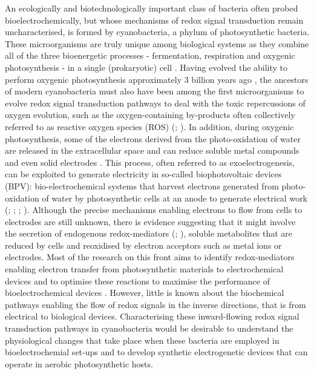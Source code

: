 An ecologically and biotechnologically important class of bacteria often probed bioelectrochemically, but whose mechanisms of redox signal transduction remain uncharacterised, is formed by cyanobacteria, a phylum of photosynthetic bacteria. These microorganisms are truly unique among biological systems as they combine all of the three bioenergetic processes - fermentation, respiration and oxygenic photosynthesis - in a single (prokaryotic) cell \citep{Peschek2011}. Having evolved  the ability to perform oxygenic photosynthesis approximately 3 billion years ago \citep{Soo2017}, the ancestors of modern cyanobacteria must also have been among the first microorganisms to evolve redox signal transduction pathways to deal with the toxic repercussions of oxygen evolution, such as the oxygen-containing by-products often collectively referred to as reactive oxygen species (ROS) (\citealt{Sharif2008}; \citealt{Reniere2018}). 
In addition, during oxygenic photosynthesis, some of the electrons derived from the photo-oxidation of water are released in the extracellular space and can reduce soluble metal compounds and even solid electrodes \citep{Pisciotta2010}. This process, often referred to as exoelectrogenesis, can be exploited to generate electricity in so-called biophotovoltaic devices (BPV): bio-electrochemical systems that harvest electrons generated from photo-oxidation of water by photosynthetic cells at an anode to generate electrical work  (\citealt{Bombelli2011}; \citealt{McCormick2015}; \citealt{Wenzel2018}; \citealt{Zhu2019}). Although the precise mechanisms enabling electrons to flow from cells to electrodes are still unknown, there is evidence suggesting that it might involve the secretion of endogenous redox-mediators (\citealt{Zhang2018}; \citealt{Thirumurthy2020}), soluble metabolites that are reduced by cells and reoxidised by electron acceptors such as metal ions or electrodes. Most of the research on this front aims to identify redox-mediators enabling electron transfer from photosynthetic materials to electrochemical devices and to optimise these reactions to maximise the performance of bioelectrochemical devices \citep{Wey2019}. 
However, little is known about the biochemical pathways enabling the flow of redox signals in the inverse directions, that is from electrical to biological devices. Characterising these inward-flowing redox signal transduction pathways in cyanobacteria would be desirable to understand the physiological changes that take place when these bacteria are employed in bioelectrochemial set-ups and to develop synthetic electrogenetic devices that can operate in aerobic photosynthetic hosts.

